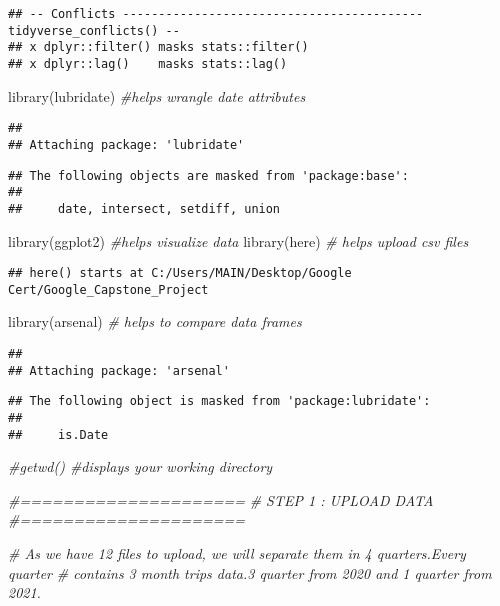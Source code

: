 \documentclass[
]{article}
\newenvironment{Shaded}{\begin{snugshade}}{\end{snugshade}}
\newcommand{\CommentTok}[1]{\textcolor[rgb]{0.56,0.35,0.01}{\textit{#1}}}
\newcommand{\FunctionTok}[1]{\textcolor[rgb]{0.00,0.00,0.00}{#1}}
\newcommand{\NormalTok}[1]{#1}
\begin{document}
\begin{verbatim}
## -- Conflicts ------------------------------------------ tidyverse_conflicts() --
## x dplyr::filter() masks stats::filter()
## x dplyr::lag()    masks stats::lag()
\end{verbatim}

\begin{Shaded}
\begin{Highlighting}[]
\FunctionTok{library}\NormalTok{(lubridate)  }\CommentTok{\#helps wrangle date attributes}
\end{Highlighting}
\end{Shaded}

\begin{verbatim}
## 
## Attaching package: 'lubridate'
\end{verbatim}

\begin{verbatim}
## The following objects are masked from 'package:base':
## 
##     date, intersect, setdiff, union
\end{verbatim}

\begin{Shaded}
\begin{Highlighting}[]
\FunctionTok{library}\NormalTok{(ggplot2)    }\CommentTok{\#helps visualize data}
\FunctionTok{library}\NormalTok{(here)       }\CommentTok{\# helps upload csv files}
\end{Highlighting}
\end{Shaded}

\begin{verbatim}
## here() starts at C:/Users/MAIN/Desktop/Google Cert/Google_Capstone_Project
\end{verbatim}

\begin{Shaded}
\begin{Highlighting}[]
\FunctionTok{library}\NormalTok{(arsenal)    }\CommentTok{\# helps to compare data frames}
\end{Highlighting}
\end{Shaded}

\begin{verbatim}
## 
## Attaching package: 'arsenal'
\end{verbatim}

\begin{verbatim}
## The following object is masked from 'package:lubridate':
## 
##     is.Date
\end{verbatim}

\begin{Shaded}
\begin{Highlighting}[]
 \CommentTok{\#getwd() \#displays your working directory}

\CommentTok{\#=====================}
\CommentTok{\# STEP 1 : UPLOAD DATA}
\CommentTok{\#=====================}

\CommentTok{\# As we have 12 files to upload, we will separate them in 4 quarters.Every quarter}
\CommentTok{\# contains 3 month trips data.3 quarter from 2020 and 1 quarter from 2021.}
\end{Highlighting}
\end{Shaded}
\end{document}
